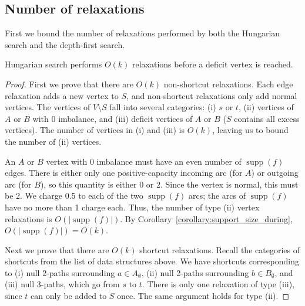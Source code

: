 \documentclass[a4paper,UKenglish]{socg-lipics-v2018}
\makeatletter
\def\supp{\operatorname{supp}}
\theoremstyle{plain}
\numberwithin{figure}{section}
\def\n@te#1{\textsf{\boldmath \textbf{$\langle\!\langle$#1$\rangle\!\rangle$}}\leavevmode}
\def\note#1{\textcolor{red}{\n@te{#1}}}
\renewcommand{\note}[1]{} %
\makeatother
\begin{document}
\begin{toappendix}
\subsection{Number of relaxations}
\label{SSA:num-relaxation}

First we bound the number of relaxations performed by both the Hungarian search and the depth-first search.

\begin{lemmarep}
\label{lemma:goldberg_hs_length}
Hungarian search performs $O(k)$ relaxations before a deficit vertex is reached.
\end{lemmarep}

\begin{proof}
\note{TO BE REWRITTEN.}
First we prove that there are $O(k)$ non-shortcut relaxations.
%
Each edge relaxation adds a new vertex to $S$, and non-shortcut relaxations
only add normal vertices.
The vertices of $V \setminus S$ fall into several categories:
(i) $s$ or $t$, (ii) vertices of $A$ or $B$ with 0 imbalance, and (iii)
deficit vertices of $A$ or $B$ ($S$ contains all excess vertices).
The number of vertices in (i) and (iii) is $O(k)$, leaving us to bound the
number of (ii) vertices.

An $A$ or $B$ vertex with $0$ imbalance must have an even number of $\supp(f)$
edges.
There is either only one positive-capacity incoming arc (for $A$) or outgoing
arc (for $B$), so this quantity is either 0 or 2.
Since the vertex is normal, this must be 2.
We charge 0.5 to each of the two $\supp(f)$ arcs; the arcs of $\supp(f)$
have no more than 1 charge each.
Thus, the number of type (ii) vertex relaxations is $O(|\supp(f)|)$.
By Corollary~\ref{corollary:support_size_during}, $O(|\supp(f)|) = O(k)$.

Next we prove that there are $O(k)$ shortcut relaxations.
%
Recall the categories of shortcuts from the list of data structures above.
We have shortcuts corresponding to (i) null 2-paths surrounding
$a \in A_\emptyset$, (ii) null 2-paths surrounding $b \in B_\emptyset$, and
(iii) null 3-paths, which go from $s$ to $t$.
%
There is only one relaxation of type (iii), since $t$ can only be added to $S$
once.
The same argument holds for type (ii).


\end{proof}
\end{toappendix}
\end{document}
